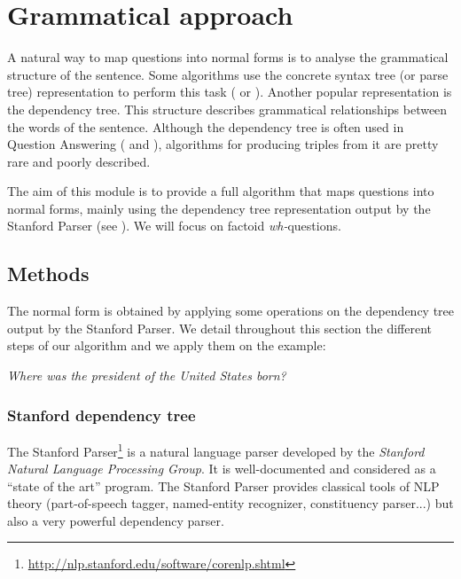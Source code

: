 \section{Grammatical approach}
\label{gramap}

A natural way to map questions into normal forms is to analyse the grammatical structure of the sentence. Some algorithms use the concrete syntax tree (or parse tree) representation to perform this task (\cite{parsetree} or \cite{parsetree2}). Another popular representation is the dependency tree. This structure describes grammatical relationships between the words of the sentence. Although the dependency tree is often used in Question Answering (\cite{Zouaq1} and \cite{Zouaq2}), algorithms for producing triples from it are pretty rare and poorly described.

The aim of this module is to provide a full algorithm that maps questions into normal forms, mainly using the dependency tree representation output by the Stanford Parser (see \cite{stanfordmanual}). We will focus on factoid \textit{wh-}questions.


\subsection{Methods}
\label{met}

The normal form is obtained by applying some operations on the dependency tree output by the Stanford Parser. We detail throughout this section the different steps of our algorithm and we apply them on the example:
\begin{center}
 \textit{Where was the president of the United States born?}
\end{center}


\subsubsection{Stanford dependency tree}
\label{sdt}

The Stanford Parser\footnote{\url{http://nlp.stanford.edu/software/corenlp.shtml}} is a natural language parser developed by the \emph{Stanford Natural Language Processing Group}. It is well-documented and considered as a ``state of the art'' program. The Stanford Parser provides classical tools of NLP theory (part-of-speech  tagger, named-entity recognizer, constituency parser...) but also a very powerful dependency parser.

